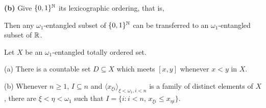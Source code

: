 \medskip

{\bf (b)} Give $\{0,1\}^{\Bbb N}$ its lexicographic ordering, that is,


\noindent Then
any
$\omega_1$-entangled subset of $\{0,1\}^{\Bbb N}$ can be transferred to an
$\omega_1$-entangled subset of $\Bbb R$.

 Let $X$ be an $\omega_1$-entangled totally ordered set.

(a) There is a countable set $D\subseteq X$ which meets $[x,y]$ whenever
$x<y$ in $X$.

(b) Whenever $n\ge 1$, $I\subseteq n$ and
$\langle x_{\xi i}\rangle_{\xi<\omega_1,i<n}$
is a family of distinct elements of $X$,
there are $\xi<\eta<\omega_1$ such that
$I=\{i:i<n$, $x_{\xi i}\le x_{\eta i}\}$.

